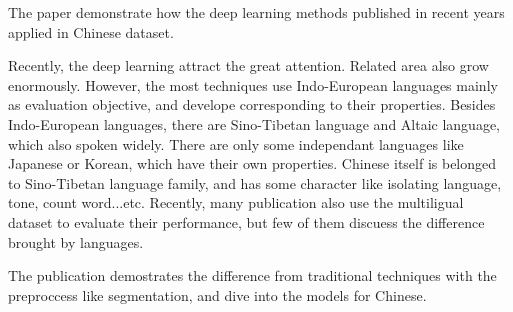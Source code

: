 \begin{abstractEN}

The paper demonstrate how the deep learning methods published in recent years applied in Chinese dataset.

Recently, the deep learning attract the great attention. Related area also grow enormously. 
However, the most techniques use Indo-European languages mainly as evaluation objective, and develope corresponding to their properties.  
Besides Indo-European languages, there are Sino-Tibetan language and Altaic language, which also spoken widely. 
There are only some independant languages like Japanese or Korean, which have their own properties.
Chinese itself is belonged to Sino-Tibetan language family, and has some character like isolating language, tone, count word...etc.
Recently, many publication also use the multiligual dataset to evaluate their performance, but few of them discuess the difference brought by languages. 

The publication demostrates the difference from traditional techniques with the preproccess like segmentation, and dive into the models for Chinese. 

\end{abstractEN}

